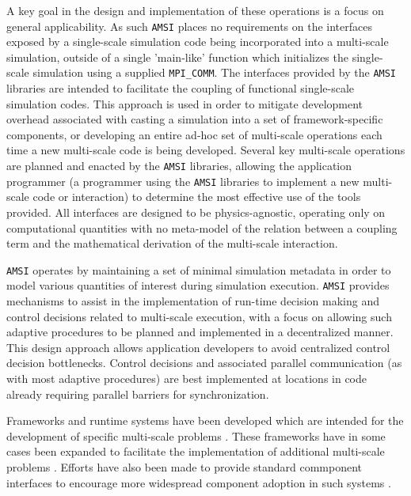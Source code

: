 \documentclass[11pt]{article}
\begin{document}
A key goal in the design and implementation of these operations is a focus on general applicability.
As such \verb|AMSI| places no requirements on the interfaces exposed by a single-scale simulation code being incorporated into a multi-scale simulation, outside of a single 'main-like' function which initializes the single-scale simulation using a supplied \verb|MPI_COMM|.
The interfaces provided by the \verb|AMSI| libraries are intended to facilitate the coupling of functional single-scale simulation codes.
This approach is used in order to mitigate development overhead associated with casting a simulation into a set of framework-specific components, or developing an entire ad-hoc set of multi-scale operations each time a new multi-scale code is being developed.
Several key multi-scale operations are planned and enacted by the \verb|AMSI| libraries, allowing the application programmer (a programmer using the \verb|AMSI| libraries to implement a new multi-scale code or interaction) to determine the most effective use of the tools provided.
All interfaces are designed to be physics-agnostic, operating only on computational quantities with no meta-model of the relation between a coupling term and the mathematical derivation of the multi-scale interaction.

\verb|AMSI| operates by maintaining a set of minimal simulation metadata in order to model various quantities of interest during simulation execution.
\verb|AMSI| provides mechanisms to assist in the implementation of run-time decision making and control decisions related to multi-scale execution, with a focus on allowing such adaptive procedures to be planned and implemented in a decentralized manner.
This design approach allows application developers to avoid centralized control decision bottlenecks.
Control decisions and associated parallel communication (as with most adaptive procedures) are best implemented at locations in code already requiring parallel barriers for synchronization.

Frameworks and runtime systems have been developed which are intended for the development of specific multi-scale problems \cite{davison2000uintah,parker2002component,chopard2011framework}.
These frameworks have in some cases been expanded to facilitate the implementation of additional multi-scale problems \cite{berzins2010uintah,parker2002component}.
Efforts have also been made to provide standard commponent interfaces to encourage more widespread component adoption in such systems \cite{armstrong1999toward}.
\end{document}
